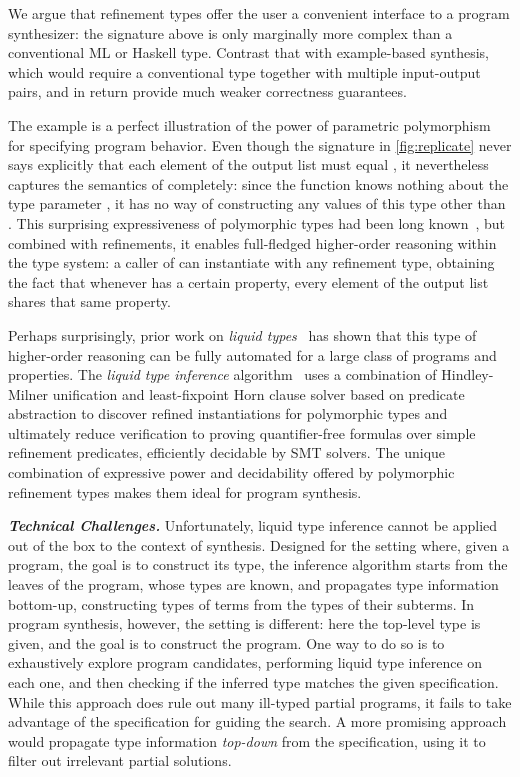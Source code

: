 \documentclass[10pt,preprint]{sigplanconf-pldi16}
\theoremstyle{definition}
\newcommand{\custompar}[1]{\parskip 0pt \textbf{\textit{#1}}}
\begin{document}
We argue that refinement types offer the user a convenient interface to a program synthesizer:
the signature above is only marginally more complex than a conventional ML or Haskell type.
Contrast that with example-based synthesis,
which would require a conventional type together with multiple input-output pairs,
and in return provide much weaker correctness guarantees.

The  example is a perfect illustration of the power of parametric polymorphism for specifying program behavior.
Even though the signature in \autoref{fig:replicate} never says explicitly that each element of the output list must equal ,
it nevertheless captures the semantics of  completely:
since the function knows nothing about the type parameter ,
it has no way of constructing any values of this type other than .
This surprising expressiveness of polymorphic types had been long known~\cite{Wadler89},
but combined with refinements, it enables full-fledged higher-order reasoning within the type system:
a caller of  can instantiate  with any refinement type,
obtaining the fact that whenever  has a certain property, every element of the output list shares that same property.

Perhaps surprisingly, prior work on \emph{liquid types}~\cite{RondonKaJh08,KawaguchiRoJh09,VazouRoJh13,VazouSeJh14} has shown that
this type of higher-order reasoning can be fully automated for a large class of programs and properties.
The \emph{liquid type inference} algorithm~\cite{RondonKaJh08}
uses a combination of Hindley-Milner unification and least-fixpoint Horn clause solver based on predicate abstraction
to discover refined instantiations for polymorphic types 
and ultimately reduce verification to proving quantifier-free formulas over simple refinement predicates,
efficiently decidable by SMT solvers.
The unique combination of expressive power and decidability offered by polymorphic refinement types
makes them ideal for program synthesis.

\custompar{Technical Challenges.}
Unfortunately, liquid type inference cannot be applied out of the box to the context of synthesis.
Designed for the setting where, given a program, the goal is to construct its type,
the inference algorithm starts from the leaves of the program, whose types are known,
and propagates type information bottom-up, 
constructing types of terms from the types of their subterms.
In program synthesis, however, the setting is different:
here the top-level type is given, and the goal is to construct the program.
One way to do so is to exhaustively explore program candidates,
performing liquid type inference on each one,
and then checking if the inferred type matches the given specification.
While this approach does rule out many ill-typed partial programs,
it fails to take advantage of the specification for guiding the search.
A more promising approach would propagate type information \emph{top-down} from the specification, 
using it to filter out irrelevant partial solutions.
\end{document}
